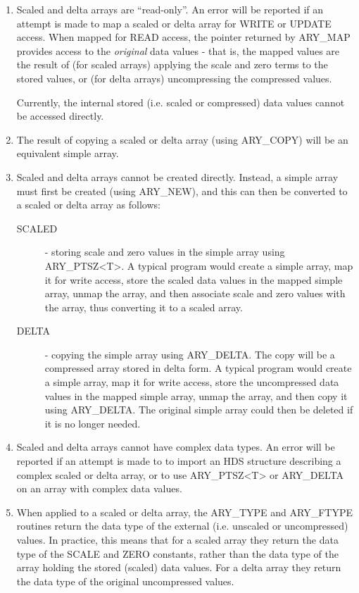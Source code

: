 \documentclass[twoside,11pt]{article}
\begin{document}
\begin{enumerate}

\item Scaled and delta arrays are ``read-only''. An error will be reported if
an attempt is made to map a scaled or delta array for WRITE or UPDATE
access. When mapped for READ access, the pointer returned by ARY\_MAP
provides access to the \emph{original} data values - that is, the mapped
values are the result of (for scaled arrays) applying the scale and zero
terms to the stored values, or (for delta arrays) uncompressing the
compressed values.

Currently, the internal stored (i.e. scaled or compressed) data values
cannot be accessed directly.

\item The result of copying a scaled or delta array (using ARY\_COPY) will be
an equivalent simple array.

\item Scaled and delta arrays cannot be created directly. Instead, a simple
array must first be created (using ARY\_NEW), and this can then be converted
to a scaled or delta array as follows:

\begin{description}

\item[SCALED] - storing scale and zero values in the simple array using
ARY\_PTSZ<T>. A typical program would create a simple array, map it for
write access, store the scaled data values in the mapped simple array,
unmap the array, and then associate scale and zero values with the array,
thus converting it to a scaled array.

\item[DELTA] - copying the simple array using ARY\_DELTA. The copy will
be a compressed array stored in delta form. A typical program would create
a simple array, map it for write access, store the uncompressed data
values in the mapped simple array, unmap the array, and then copy it using
ARY\_DELTA. The original simple array could then be deleted if it is no
longer needed.

\end{description}

\item Scaled and delta arrays cannot have complex data types. An error will be
reported if an attempt is made to to import an HDS structure describing a
complex scaled or delta array, or to use ARY\_PTSZ<T> or ARY\_DELTA on an
array with complex data values.

\item When applied to a scaled or delta array, the ARY\_TYPE and ARY\_FTYPE
routines return the data type of the external (i.e. unscaled or uncompressed)
values. In practice, this means that for a scaled array they return the data
type of the SCALE and ZERO constants, rather than the data type of the array
holding the stored (scaled) data values. For a delta array they return
the data type of the original uncompressed values.

\end{enumerate}
\end{document}

